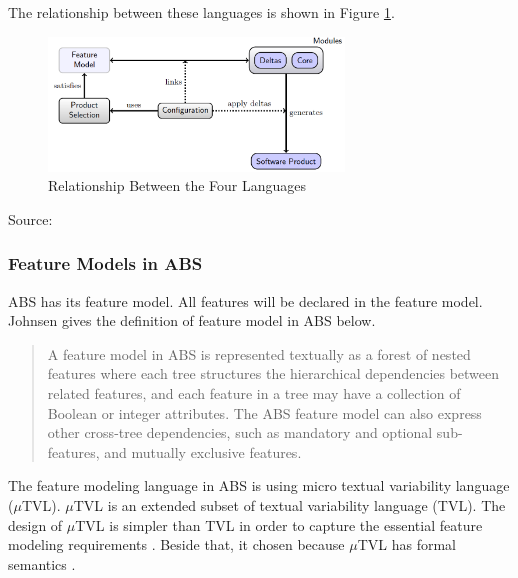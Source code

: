 The relationship between these languages is shown in Figure \ref{fig:RelationshipFourLanguages}.

\begin{figure}
	\centering
	\includegraphics[width=0.7\textwidth]
	{pics/RelationshipFourLanguages.png}
	\caption{Relationship Between the Four Languages}
	\label{fig:RelationshipFourLanguages}
\end{figure}
\vspace{-1cm}
\begin{center}
	{\small Source: \citep{paper.clarke.variability}}
\end{center}


\subsubsection{Feature Models in ABS}\label{FeatureModelABS}
ABS has its feature model. All features will be declared in the feature model.
Johnsen \citep{paper.johnsen2014.deploymentVariabilityinDeltaOriented} gives the definition of feature model in ABS below.

\begin{quote}
	A feature model in ABS is represented textually as a forest of nested features where each tree structures the hierarchical dependencies between related features, and each feature in a tree may have a collection of Boolean or integer attributes. The ABS feature model can also express other cross-tree dependencies, such as mandatory and optional sub-features, and mutually exclusive features.
\end{quote}

The feature modeling language in ABS is using micro textual variability language ($\mu$TVL). $\mu$TVL is an extended subset of textual variability language (TVL). The design of $\mu$TVL is simpler than TVL in order to capture the essential feature modeling requirements \citep{paper.clarke.variability,paper.hanle.ABStutorial}. Beside that, it chosen because $\mu$TVL has formal semantics \citep{thesis.niken.deltaRelationalMappingUsingABS}.

